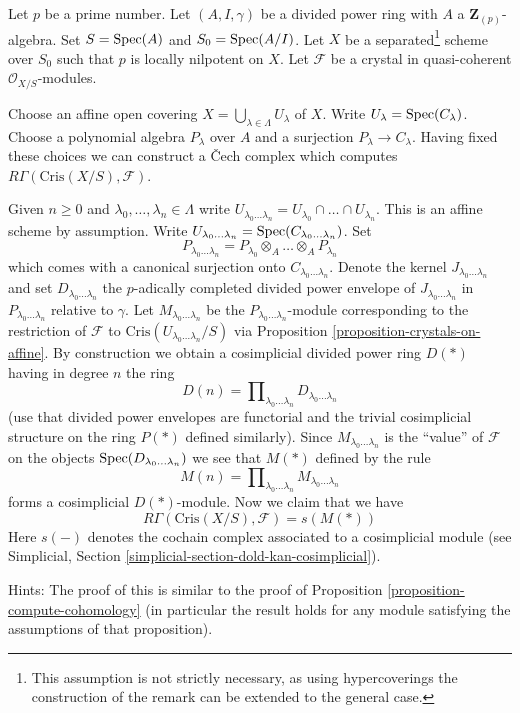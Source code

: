 \begin{remark}
\label{remark-cech-complex}
Let $p$ be a prime number. Let $(A, I, \gamma)$ be a divided power
ring with $A$ a $\mathbf{Z}_{(p)}$-algebra. Set $S = \mathop{\mathrm{Spec}}(A)$ and
$S_0 = \mathop{\mathrm{Spec}}(A/I)$. Let $X$ be a separated\footnote{This assumption is
not strictly necessary, as using hypercoverings the construction of the
remark can be extended to the general case.} scheme over
$S_0$ such that $p$ is locally nilpotent on $X$. Let $\mathcal{F}$ be a
crystal in quasi-coherent $\mathcal{O}_{X/S}$-modules.

\medskip\noindent
Choose an affine open covering
$X = \bigcup_{\lambda \in \Lambda} U_\lambda$ of $X$.
Write $U_\lambda = \mathop{\mathrm{Spec}}(C_\lambda)$. Choose a polynomial algebra
$P_\lambda$ over $A$ and a surjection $P_\lambda \to C_\lambda$.
Having fixed these choices we can construct a {\v C}ech complex which
computes $R\Gamma(\text{Cris}(X/S), \mathcal{F})$.

\medskip\noindent
Given $n \geq 0$ and $\lambda_0, \ldots, \lambda_n \in \Lambda$
write $U_{\lambda_0 \ldots \lambda_n} = U_{\lambda_0} \cap \ldots
\cap U_{\lambda_n}$. This is an affine scheme by assumption. Write
$U_{\lambda_0 \ldots \lambda_n} = \mathop{\mathrm{Spec}}(C_{\lambda_0 \ldots \lambda_n})$.
Set
$$
P_{\lambda_0 \ldots \lambda_n} =
P_{\lambda_0} \otimes_A \ldots \otimes_A P_{\lambda_n}
$$
which comes with a canonical surjection onto $C_{\lambda_0 \ldots \lambda_n}$.
Denote the kernel $J_{\lambda_0 \ldots \lambda_n}$ and set
$D_{\lambda_0 \ldots \lambda_n}$
the $p$-adically completed divided power envelope of
$J_{\lambda_0 \ldots \lambda_n}$ in $P_{\lambda_0 \ldots \lambda_n}$
relative to $\gamma$. Let $M_{\lambda_0 \ldots \lambda_n}$ be the
$P_{\lambda_0 \ldots \lambda_n}$-module corresponding
to the restriction of $\mathcal{F}$ to
$\text{Cris}(U_{\lambda_0 \ldots \lambda_n}/S)$ via
Proposition \ref{proposition-crystals-on-affine}.
By construction we obtain a cosimplicial divided power ring $D(*)$
having in degree $n$ the ring
$$
D(n) =
\prod\nolimits_{\lambda_0 \ldots \lambda_n}
D_{\lambda_0 \ldots \lambda_n}
$$
(use that divided power envelopes are functorial and the trivial
cosimplicial structure on the ring $P(*)$ defined similarly).
Since $M_{\lambda_0 \ldots \lambda_n}$ is the ``value'' of $\mathcal{F}$
on the objects $\mathop{\mathrm{Spec}}(D_{\lambda_0 \ldots \lambda_n})$ we see that
$M(*)$ defined by the rule
$$
M(n) = \prod\nolimits_{\lambda_0 \ldots \lambda_n}
M_{\lambda_0 \ldots \lambda_n}
$$
forms a cosimplicial $D(*)$-module. Now we claim that we have
$$
R\Gamma(\text{Cris}(X/S), \mathcal{F}) = s(M(*))
$$
Here $s(-)$ denotes the cochain complex associated to a cosimplicial
module (see
Simplicial, Section \ref{simplicial-section-dold-kan-cosimplicial}).

\medskip\noindent
Hints: The proof of this is similar to the proof of
Proposition \ref{proposition-compute-cohomology} (in particular
the result holds for any module satisfying the assumptions of
that proposition).
\end{remark}

